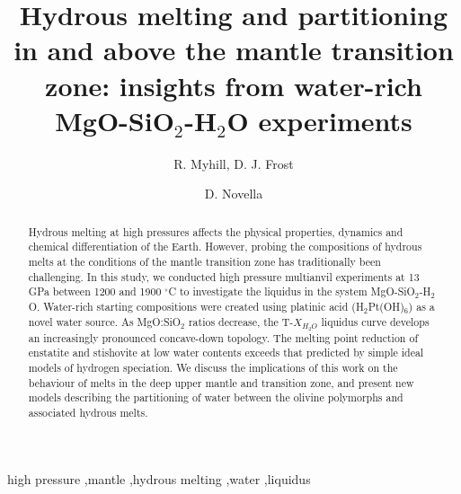 \documentclass[review]{elsarticle}
\begin{document}
\begin{frontmatter}

\title{Hydrous melting and partitioning in and above the mantle transition zone: insights from water-rich MgO-SiO$_2$-H$_2$O experiments}

\author{R. Myhill, D. J. Frost}
\address{Bayerisches Geoinstitut, Universit\"{a}t Bayreuth, Universit\"{a}tsstrasse 30, 95447 Bayreuth, Germany}

\author{D. Novella}
\address{Laboratoire Magmas et Volcans, Universit\'{e} Blaise Pascal, 5 Rue Kessler, 63038 Clermond-Ferrand, France}




\begin{abstract}
Hydrous melting at high pressures affects the physical properties, dynamics and chemical differentiation of the Earth. However, probing the compositions of hydrous melts at the conditions of the mantle transition zone has traditionally been challenging. In this study, we conducted high pressure multianvil experiments at 13 GPa between 1200 and 1900 $^{\circ}$C to investigate the liquidus in the system MgO-SiO$_2$-H$_2$O. Water-rich starting compositions were created using platinic acid (H$_2$Pt(OH)$_6$) as a novel water source. As MgO:SiO$_2$ ratios decrease, the T-$X_{H_2O}$ liquidus curve develops an increasingly pronounced concave-down topology. The melting point reduction of enstatite and stishovite at low water contents exceeds that predicted by simple ideal models of hydrogen speciation. We discuss the implications of this work on the behaviour of melts in the deep upper mantle and transition zone, and present new models describing the partitioning of water between the olivine polymorphs and associated hydrous melts. 
\end{abstract}

\begin{keyword}
high pressure \sep mantle \sep hydrous melting \sep water \sep liquidus
\end{keyword}

\end{frontmatter}
\end{document}
